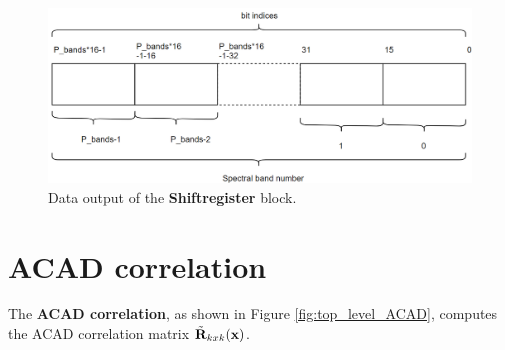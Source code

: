 \begin{figure}[H]
\centering
   \includegraphics[scale=0.3]{images/data_format_shiftregister.PNG}
  \caption{Data output of the \textbf{Shiftregister} block. } 
  \label{fig:shiftregister_data_out}
\end{figure}



\section{ACAD correlation}
\label{sec:correlation_hw}
The \textbf{ACAD correlation}, as shown in Figure \ref{fig:top_level_ACAD}, computes the ACAD correlation matrix $\Tilde{\textbf{R}}_{k x k}(\textbf{x})$.
\\

\\







